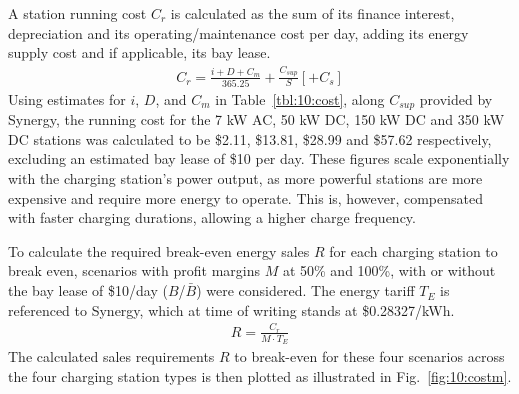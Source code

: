 A station running cost $C_r$ is calculated as the sum of its finance interest, depreciation and its operating/maintenance cost per day, adding its energy supply cost and if applicable, its bay lease.
\begin{align}
C_r = \frac{i + D + C_m}{365.25} + \frac{C_{sup}}{S}[+C_s]
\end{align}  
Using estimates for $i$, $D$, and $C_m$ in Table~\ref{tbl:10:cost}, along $C_{sup}$ provided by Synergy, the running cost for the 7 kW AC, 50 kW DC, 150 kW DC and 350 kW DC stations was calculated to be \$2.11, \$13.81, \$28.99 and \$57.62 respectively, excluding an estimated bay lease of \$10 per day. These figures scale exponentially with the charging station’s power output, as more powerful stations are more expensive and require more energy to operate. This is, however, compensated with faster charging durations, allowing a higher charge frequency.


To calculate the required break-even energy sales $R$ for each charging station to break even, scenarios with profit margins $M$ at 50\% and 100\%, with or without the bay lease of \$10/day ($B$/$\bar{B}$) were considered. The energy tariff $T_E$ is referenced to Synergy, which at time of writing stands at \$0.28327/kWh. 
\begin{align}
R = \frac{C_r}{M \cdot T_E}
\end{align}
The calculated sales requirements $R$ to break-even for these four scenarios across the four charging station types is then plotted as illustrated in Fig.~\ref{fig:10:costm}.

